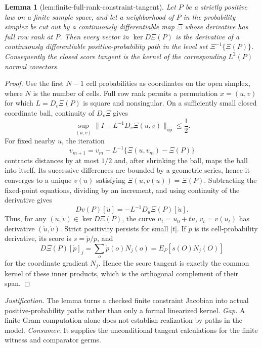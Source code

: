 \documentclass{article}
\newtheorem{lemma}{Lemma}
\begin{document}
\begin{lemma}[lem:finite-full-rank-constraint-tangent]\label{lem:finite-full-rank-constraint-tangent}
Let \(P\) be a strictly positive law on a finite sample space, and let a neighborhood of \(P\) in the probability simplex be cut out by a continuously differentiable map \(\Xi\) whose derivative has full row rank at \(P\). Then every vector in \(\ker D\Xi(P)\) is the derivative of a continuously differentiable positive-probability path in the level set \(\Xi^{-1}\{\Xi(P)\}\). Consequently the closed score tangent is the kernel of the corresponding \(L^2(P)\) normal covectors.
\end{lemma}
\begin{proof}
Use the first \(N-1\) cell probabilities as coordinates on the open simplex, where \(N\) is the number of cells.  Full row rank permits a permutation \(x=(u,v)\) for which \(L=D_v\Xi(P)\) is square and nonsingular.  On a sufficiently small closed coordinate ball, continuity of \(D_v\Xi\) gives
\[
\sup_{(u,v)}\|I-L^{-1}D_v\Xi(u,v)\|_{\mathrm{op}}\le\frac12.
\]
For fixed nearby \(u\), the iteration
\[
v_{m+1}=v_m-L^{-1}\{\Xi(u,v_m)-\Xi(P)\}
\]
contracts distances by at most \(1/2\) and, after shrinking the ball, maps the ball into itself.  Its successive differences are bounded by a geometric series, hence it converges to a unique \(v(u)\) satisfying \(\Xi(u,v(u))=\Xi(P)\).  Subtracting the fixed-point equations, dividing by an increment, and using continuity of the derivative gives
\[
Dv(P)[\dot u]=-L^{-1}D_u\Xi(P)[\dot u].
\]
Thus, for any \((\dot u,\dot v)\in\ker D\Xi(P)\), the curve \(u_t=u_0+t\dot u\), \(v_t=v(u_t)\) has derivative \((\dot u,\dot v)\).  Strict positivity persists for small \(|t|\).  If \(\dot p\) is its cell-probability derivative, its score is \(s=\dot p/p\), and
\[
D\Xi(P)[\dot p]_j=\sum_o\dot p(o)N_j(o)=E_P[s(O)N_j(O)]
\]
for the coordinate gradient \(N_j\).  Hence the score tangent is exactly the common kernel of these inner products, which is the orthogonal complement of their span.
\end{proof}
\par\smallskip\noindent \textit{Justification.} The lemma turns a checked finite constraint Jacobian into actual positive-probability paths rather than only a formal linearized kernel. \textit{Gap.} A finite Gram computation alone does not establish realization by paths in the model. \textit{Consumer.} It supplies the unconditional tangent calculations for the finite witness and comparator germs.
\end{document}
